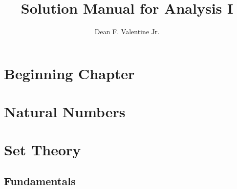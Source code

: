 \documentclass{article}
\title{Solution Manual for Analysis I}
\author{Dean F. Valentine Jr.}
\begin{document}
    \maketitle
    \section{Beginning Chapter}
    \section{Natural Numbers}
    \section{Set Theory}
    \subsection{Fundamentals}
\end{document}
